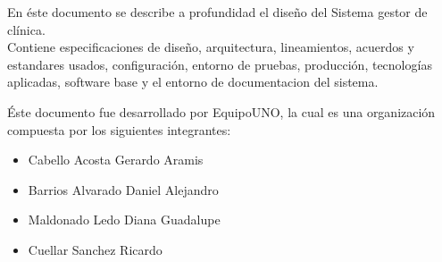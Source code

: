 


En \'este documento se describe a profundidad el diseño del Sistema gestor de cl\'inica.\\
Contiene especificaciones de diseño, arquitectura, lineamientos, acuerdos y estandares usados, configuraci\'on, entorno de pruebas, producci\'on, tecnolog\'ias aplicadas, software base y el entorno de documentacion del sistema. 

\'Este documento fue desarrollado por EquipoUNO, la cual es una organizaci\'on compuesta por los siguientes integrantes:
\begin{itemize}
\item Cabello Acosta Gerardo Aramis
\item Barrios Alvarado Daniel Alejandro
\item Maldonado Ledo Diana Guadalupe
\item Cuellar Sanchez Ricardo
\end{itemize}


